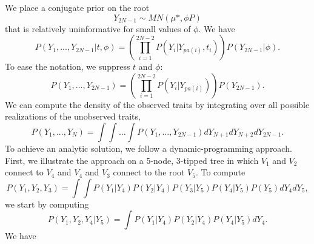 \documentclass[12pt]{article}
\begin{document}
We place a conjugate prior on the root 
\begin{equation}
Y_{2N-1} \sim MN \left(\mu*, \phi P \right)
\end{equation}
that is relatively uninformative for small values of $\phi$.  We have
\begin{equation}
P(Y_1,...,Y_{2N-1} |t,\phi ) = \left(  \prod_{i=1}^{2N-2} P(Y_i | Y_{pa(i)},t_i) \right) P(Y_{2N-1} | \phi).
\end{equation}
To ease the notation, we suppress $t$ and $\phi$:
\begin{equation}
P(Y_1,...,Y_{2N-1}) = \left(  \prod_{i=1}^{2N-2} P(Y_i | Y_{pa(i)}) \right) P(Y_{2N-1} ).
\end{equation}
We can compute the density of the observed traits by integrating over all possible realizations of the
unobserved traits,
\begin{equation}
P(Y_1,...,Y_N) = \int \int \dots \int P(Y_1, \dots, Y_{2N-1}) dY_{N+1} dY_{N+2} dY_{2N-1}.
\end{equation}
To achieve an analytic solution, we follow a dynamic-programming approach.  First, we illustrate the approach on a
5-node, 3-tipped tree in which $V_1$ and $V_2$ connect to $V_4$ and $V_4$ and $V_3$ connect to the root $V_5$.  
To compute
\begin{equation}
P(Y_1,Y_2,Y_3) = \int \int P(Y_1 | Y_4) P(Y_2 | Y_4)  P(Y_3 | Y_5) P(Y_4 | Y_5) P(Y_5) dY_4 dY_5 ,
\end{equation}
we start by computing
\begin{equation}
P(Y_1,Y_2,Y_4 | Y_5) = \int  P(Y_1 | Y_4) P(Y_2 | Y_4) P(Y_4 | Y_5) dY_4.
\end{equation}
We have
\end{document}
